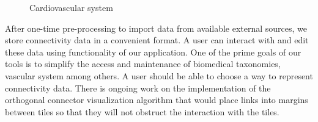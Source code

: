 \begin{figure}
\centering
  \caption{Cardiovascular system}
  \label{fig:vascular-connectivity}
\end{figure}

After one-time pre-processing to import data from available external sources, we store connectivity data in a convenient format. A user can interact with and edit these data using functionality of our application. One of the prime goals of our tools is to simplify the access and maintenance of biomedical taxonomies, vascular system among others. A user should be able to choose a way to represent connectivity data. There is ongoing work on the implementation of the orthogonal connector visualization algorithm that would place links into margins between tiles so that they will not obstruct the interaction with the tiles.


